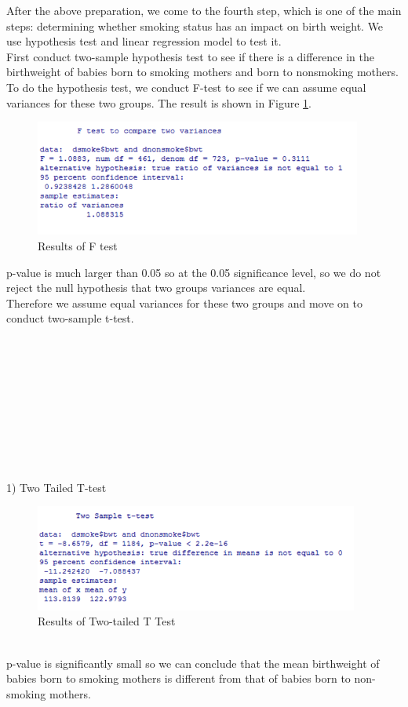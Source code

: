 \documentclass[oneside,12pt]{report}
\begin{document}
After the above preparation, we come to the fourth step, which is one of the main steps: determining whether smoking status has an impact on birth weight. We use hypothesis test and linear regression model to test it.\\
\indent First conduct two-sample hypothesis test to see if there is a difference in the birthweight of babies born to smoking mothers and born to nonsmoking mothers. To do the hypothesis test, we conduct F-test to see if we can assume equal variances for these two groups. The result is shown in Figure \ref{fig:ftest}.
\begin{figure}[htb]
    \begin{center}
        \includegraphics[width=0.96\textwidth]{ftest.png}
    \end{center}
    \caption{Results of F test}
    \label{fig:ftest}
\end{figure}
p-value is much larger than 0.05 so at the 0.05 significance level, so we do not reject the null hypothesis that two groups variances are equal.\\
\indent Therefore we assume equal variances for these two groups and move on to conduct two-sample t-test.\\
\\
\\
\\
\\
\\
\\
\\
\\
\\
\\
1)	Two Tailed T-test\\
\begin{figure}[htb]
    \begin{center}
        \includegraphics[width=0.95\textwidth]{twotailttest.png}
    \end{center}
    \caption{Results of Two-tailed T Test}
    \label{fig:twotailttest}
\end{figure}\\
\indent p-value is significantly small so we can conclude that the mean birthweight of babies born to smoking mothers is different from that of babies born to non-smoking mothers.\\
\end{document}
